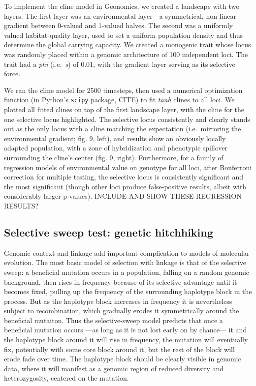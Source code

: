 ﻿\documentclass{article}
\begin{document}
To implement the cline model in Geonomics, we created a landscape with two layers.
The first layer was an environmental layer---a symmetrical, non-linear gradient
between 0-valued and 1-valued halves.
The second was a uniformly valued habitat-quality layer, used to set a uniform
population density and thus determine the global carrying capacity.
We created a monogenic trait whose locus was randomly placed within a
genomic architecture of 100 independent loci.
The trait had a \emph{phi} (i.e.\ \emph{s}) of 0.01,
with the gradient layer serving as its selective force.

We ran the cline model for 2500 timesteps, then used a numerical optimization function
(in Python's \texttt{scipy} package, {\large CITE}) to fit \emph{tanh} clines to all loci.
We plotted all fitted clines on top of the first landscape layer,
with the cline for the one selective locus highlighted.
The selective locus consistently and clearly stands out as the only locus with a cline
matching the expectation (i.e.\ mirroring the environmental gradient; fig. 9, left),
and results show an obviously locally adapted population, with a zone of hybridization
and phenotypic spillover surrounding the cline's center (fig. 9, right).
Furthermore, for a family of regression models of environmental value
on genotype for all loci, after Bonferroni correction for multiple testing,
the selective locus is consistently significant and the most significant 
(though other loci produce false-positive results, albeit with considerably larger p-values).
INCLUDE AND SHOW THESE REGRESSION RESULTS?


\subsection{Selective sweep test: genetic hitchhiking}
Genomic context and linkage add important complication to models of molecular evolution.
The most basic model of selection with linkage is that of the selective sweep:
a beneficial mutation occurs in a population, falling on a random genomic background,
then rises in frequency because of its selective advantage until it becomes fixed,
pulling up the frequency of the surrounding haplotype block in the process.
But as the haplotype block increases in frequency it is nevertheless subject to recombination,
which gradually erodes it symmetrically around the beneficial mutaiton.
Thus the selective-sweep model predicts that once a beneficial mutation occurs
---as long as it is not lost early on by chance---
it and the haplotype block around it will rise in frequency,
the mutation will eventually fix, potentially with some core block around it,
but the rest of the block will erode fade over time.
The haplotype block should be clearly visible in genomic data,
where it will manifest as a genomic region of reduced diversity and heterozygosity,
centered on the mutation.
\end{document}
